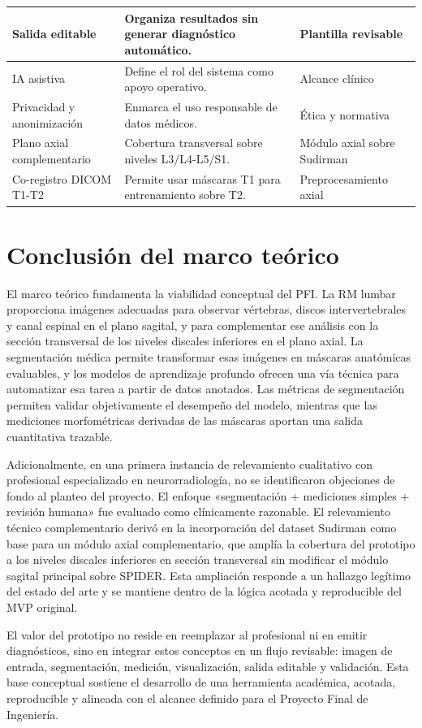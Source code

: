 \begin{longtable}{|>{\raggedright\arraybackslash}p{}|>{\raggedright\arraybackslash}p{}|>{\raggedright\arraybackslash}p{}|}
\hline
Salida editable & Organiza resultados sin generar diagnóstico automático. & Plantilla revisable \\
\hline
IA asistiva & Define el rol del sistema como apoyo operativo. & Alcance clínico \\
\hline
Privacidad y anonimización & Enmarca el uso responsable de datos médicos. & Ética y normativa \\
\hline
Plano axial complementario & Cobertura transversal sobre niveles L3/L4-L5/S1. & Módulo axial sobre Sudirman \\
\hline
Co-registro DICOM T1-T2 & Permite usar máscaras T1 para entrenamiento sobre T2. & Preprocesamiento axial \\
\hline
\end{longtable}
\endgroup

\section{Conclusión del marco teórico}

El marco teórico fundamenta la viabilidad conceptual del PFI. La RM lumbar proporciona imágenes adecuadas para observar vértebras, discos intervertebrales y canal espinal en el plano sagital, y para complementar ese análisis con la sección transversal de los niveles discales inferiores en el plano axial. La segmentación médica permite transformar esas imágenes en máscaras anatómicas evaluables, y los modelos de aprendizaje profundo ofrecen una vía técnica para automatizar esa tarea a partir de datos anotados. Las métricas de segmentación permiten validar objetivamente el desempeño del modelo, mientras que las mediciones morfométricas derivadas de las máscaras aportan una salida cuantitativa trazable.

Adicionalmente, en una primera instancia de relevamiento cualitativo con profesional especializado en neurorradiología, no se identificaron objeciones de fondo al planteo del proyecto. El enfoque «segmentación + mediciones simples + revisión humana» fue evaluado como clínicamente razonable. El relevamiento técnico complementario derivó en la incorporación del dataset Sudirman como base para un módulo axial complementario, que amplía la cobertura del prototipo a los niveles discales inferiores en sección transversal sin modificar el módulo sagital principal sobre SPIDER. Esta ampliación responde a un hallazgo legítimo del estado del arte y se mantiene dentro de la lógica acotada y reproducible del MVP original.

El valor del prototipo no reside en reemplazar al profesional ni en emitir diagnósticos, sino en integrar estos conceptos en un flujo revisable: imagen de entrada, segmentación, medición, visualización, salida editable y validación. Esta base conceptual sostiene el desarrollo de una herramienta académica, acotada, reproducible y alineada con el alcance definido para el Proyecto Final de Ingeniería.
